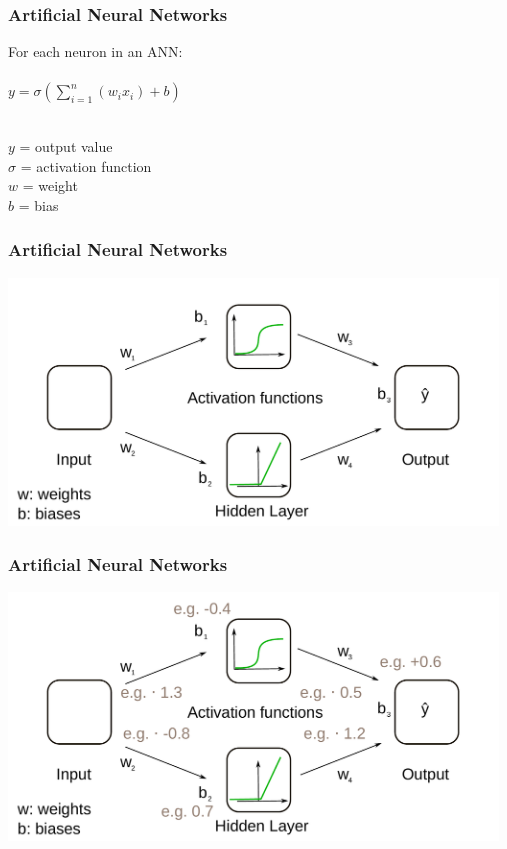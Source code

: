 \documentclass[aspectratio=169]{beamer}
\begin{document}
\begin{frame}
  \frametitle{Artificial Neural Networks}
  \begin{center}
    For each neuron in an ANN:\\
    \ \\
    {
    \Large      
      $y = \sigma (\sum_{i=1}^{n} {(w_{i} x_{i}) + b})$  \\
    }
    \ \\
  \end{center}

    $y$ = output value\\
    $\sigma$ = activation function\\
    $w$ = weight\\
    $b$ = bias\\
  
\end{frame}

\begin{frame}
  \frametitle{Artificial Neural Networks}
  \begin{center}
    \includegraphics[width=13.0cm]{images/ANN_details_without_example_numbers.pdf}
  \end{center}  
\end{frame}

\begin{frame}
  \frametitle{Artificial Neural Networks}
  \begin{center}
    \includegraphics[width=13.0cm]{images/ANN_details_with_example_numbers.pdf}
  \end{center}  
\end{frame}
\end{document}
